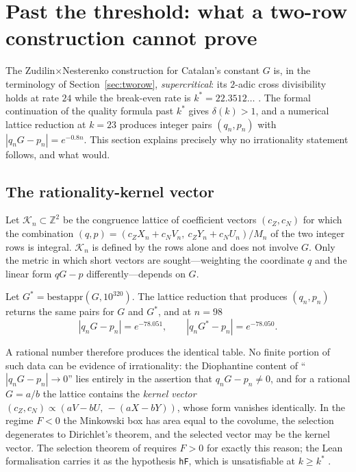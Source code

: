 \section{Past the threshold: what a two-row construction cannot prove}\label{sec:threshold}

The Zudilin$\times$Nesterenko construction for Catalan's constant $G$ is, in the terminology of Section~\ref{sec:tworow}, \emph{supercritical}: its $2$-adic cross divisibility holds at rate $24$ while the break-even rate is $k^*=22.3512\ldots$ \cite{CatalanLean}. The formal continuation of the quality formula past $k^*$ gives $\delta(k)>1$, and a numerical lattice reduction at $k=23$ produces integer pairs $(q_n,p_n)$ with $|q_nG-p_n|=e^{-0.8n}$. This section explains precisely why no irrationality statement follows, and what would.

\subsection{The rationality-kernel vector}

Let $\mathcal K_n\subset\mathbb Z^2$ be the congruence lattice of coefficient vectors $(c_Z,c_N)$ for which the combination $(q,p)=(c_ZX_n+c_NV_n,\ c_ZY_n+c_NU_n)/M_n$ of the two integer rows is integral. $\mathcal K_n$ is defined by the rows alone and does not involve $G$. Only the metric in which short vectors are sought---weighting the coordinate $q$ and the linear form $qG-p$ differently---depends on $G$.

\begin{proposition}[Control]\label{prop:control}
Let $G^*=\mathrm{bestappr}(G,10^{320})$. The lattice reduction that produces $(q_n,p_n)$ returns the same pairs for $G$ and $G^*$, and at $n=98$
\[
|q_nG-p_n|=e^{-78.051},\qquad |q_nG^*-p_n|=e^{-78.050}.
\]
\end{proposition}
A rational number therefore produces the identical table. No finite portion of such data can be evidence of irrationality: the Diophantine content of ``$|q_nG-p_n|\to0$'' lies entirely in the assertion that $q_nG-p_n\ne0$, and for a rational $G=a/b$ the lattice contains the \emph{kernel vector} $(c_Z,c_N)\propto(aV-bU,\,-(aX-bY))$, whose form vanishes identically. In the regime $F<0$ the Minkowski box has area equal to the covolume, the selection degenerates to Dirichlet's theorem, and the selected vector may be the kernel vector. The selection theorem of \cite{CatalanLCM} requires $F>0$ for exactly this reason; the Lean formalisation carries it as the hypothesis \texttt{hF}, which is unsatisfiable at $k\ge k^*$ \cite{CatalanLean}.

